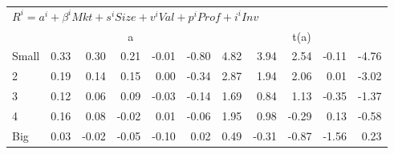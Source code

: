 \begin{table}[H]
\begin{tabular}{lrrrrrrrrrr}
  \midrule
  \multicolumn{11}{l}{$R^i=a^i+\beta^iMkt+s^iSize+v^iVal+p^iProf+i^iInv$}  \\
  
     & \multicolumn{5}{c}{a} & \multicolumn{5}{c}{t(a)}   \\
     \cmidrule(r){2-6} \cmidrule(r){7-11} 
    Small  & 0.33  & 0.30  & 0.21  & -0.01  & -0.80  & 4.82  & 3.94  & 2.54  & -0.11  & -4.76   \\
    2  & 0.19  & 0.14  & 0.15  & 0.00  & -0.34  & 2.87  & 1.94  & 2.06  & 0.01  & -3.02   \\
    3  & 0.12  & 0.06  & 0.09  & -0.03  & -0.14  & 1.69  & 0.84  & 1.13  & -0.35  & -1.37   \\
    4  & 0.16  & 0.08  & -0.02  & 0.01  & -0.06  & 1.95  & 0.98  & -0.29  & 0.13  & -0.58   \\
    Big  & 0.03  & -0.02  & -0.05  & -0.10  & 0.02  & 0.49  & -0.31  & -0.87  & -1.56  & 0.23   \\
  
  \bottomrule
\end{tabular}
\label{tbl:Size_Var}
\end{table}